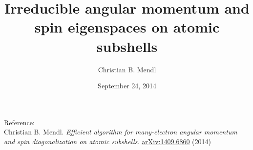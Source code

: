 \documentclass[a4paper,10pt]{article}
\title{Irreducible angular momentum and spin eigenspaces on atomic subshells}
\author{Christian B. Mendl}
\date{September 24, 2014}
\begin{document}
\maketitle

\noindent Reference: \\
Christian B. Mendl. \emph{Efficient algorithm for many-electron angular momentum and spin diagonalization on atomic subshells.}
\href{http://arxiv.org/abs/1409.6860}{arXiv:1409.6860} (2014)


\end{document}
